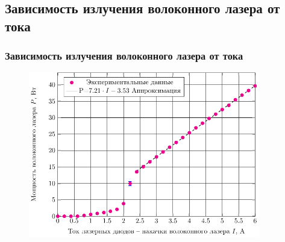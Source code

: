 \documentclass[10pt,pdf,hyperref={unicode}, dvipsnames]{beamer}
\newcommand\frametitless[1]{\subsection{#1}\frametitle{#1}}
\begin{document}
\begin{frame}[t] 
	\frametitless{Зависимость излучения волоконного лазера от тока}
		\begin{figure}[tb]
		\centering
		\includegraphics[width=0.9\textwidth]{img/PI}
	\end{figure}
\end{frame}
\end{document}
